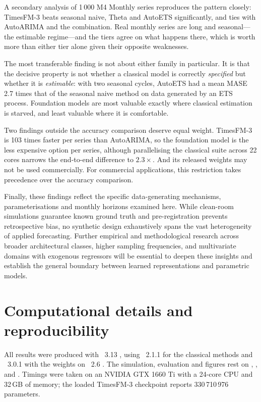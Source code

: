 \documentclass[article]{ajs}
\begin{document}
A secondary analysis of 1\,000 M4 Monthly series reproduces the pattern closely: TimesFM-3 beats
seasonal naive, Theta and AutoETS significantly, and ties with AutoARIMA and the combination.
Real monthly series are long and seasonal---the estimable regime---and the tiers agree on what
happens there, which is worth more than either tier alone given their opposite weaknesses.

The most transferable finding is not about either family in particular. It is that the
decisive property is not whether a classical model is correctly \emph{specified} but whether it
is \emph{estimable}: with two seasonal cycles, AutoETS had a mean MASE 2.7 times that of the
seasonal naive method on data generated by an ETS process. Foundation models are most valuable exactly where
classical estimation is starved, and least valuable where it is comfortable.

Two findings outside the accuracy comparison deserve equal weight. TimesFM-3 is 103 times
faster per series than AutoARIMA, so the foundation model is the less expensive option per series,
although parallelising the classical suite across 22 cores narrows the end-to-end difference to
$2.3\times$. And its released weights may not be used commercially. For commercial applications,
this restriction takes precedence over the accuracy comparison.

Finally, these findings reflect the specific data-generating mechanisms, parameterisations and
monthly horizons examined here. While clean-room simulations guarantee known ground truth and
pre-registration prevents retrospective bias, no synthetic design exhaustively spans the vast heterogeneity
of applied forecasting. Further empirical and methodological research across broader architectural classes,
higher sampling frequencies, and multivariate domains with exogenous regressors will be essential to
deepen these insights and establish the general boundary between learned representations and parametric models.

\section{Computational details and reproducibility}
\label{sec:repro}

All results were produced with ~3.13 \citep{python}, using
~2.1.1 \citep{statsforecast} for the classical methods and
~3.0.1 with the  weights \citep{timesfm3repo}
on ~2.6 \citep{paszke2019pytorch}. The simulation, evaluation and figures rest on
 \citep{harris2020numpy},  \citep{mckinney2010pandas}, 
\citep{virtanen2020scipy} and  \citep{hunter2007matplotlib}. Timings were taken
on an NVIDIA GTX 1660 Ti with a 24-core CPU and 32\,GB of memory; the loaded TimesFM-3
checkpoint reports 330\,710\,976 parameters.
\end{document}
